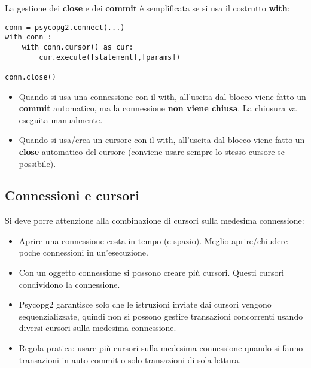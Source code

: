 \documentclass[a4paper, 10pt, titlepage]{article}
\begin{document}
	La gestione dei \textbf{close} e dei \textbf{commit} è semplificata se si usa il costrutto \textbf{with}:
	\begin{lstlisting}[frame=tb]
conn = psycopg2.connect(...)
with conn :
	with conn.cursor() as cur:
		cur.execute([statement],[params])
		
conn.close()
	\end{lstlisting}
	\begin{itemize}
	\item Quando si usa una connessione con il with, all’uscita dal blocco viene fatto un \textbf{commit} automatico, ma la connessione \textbf{non viene chiusa}. La chiusura va eseguita manualmente.
	\item Quando si usa/crea un cursore con il with, all’uscita dal blocco viene fatto un \textbf{close} automatico del cursore (conviene usare sempre lo stesso cursore se possibile).
	\end{itemize}
	\subsection{Connessioni e cursori}
	Si deve porre attenzione alla combinazione di cursori sulla medesima connessione:
	\begin{itemize}
	\item Aprire una connessione costa in tempo (e spazio). Meglio
aprire/chiudere poche connessioni in un’esecuzione.
	\item Con un oggetto connessione si possono creare più cursori. Questi cursori condividono la connessione.
	\item Psycopg2 garantisce solo che le istruzioni inviate dai cursori vengono sequenzializzate, quindi non si possono gestire transazioni concorrenti usando diversi cursori sulla medesima connessione.
	\item Regola pratica: usare più cursori sulla medesima connessione quando si fanno transazioni in auto-commit o solo transazioni di sola lettura.
	\end{itemize}
	
\end{document}
